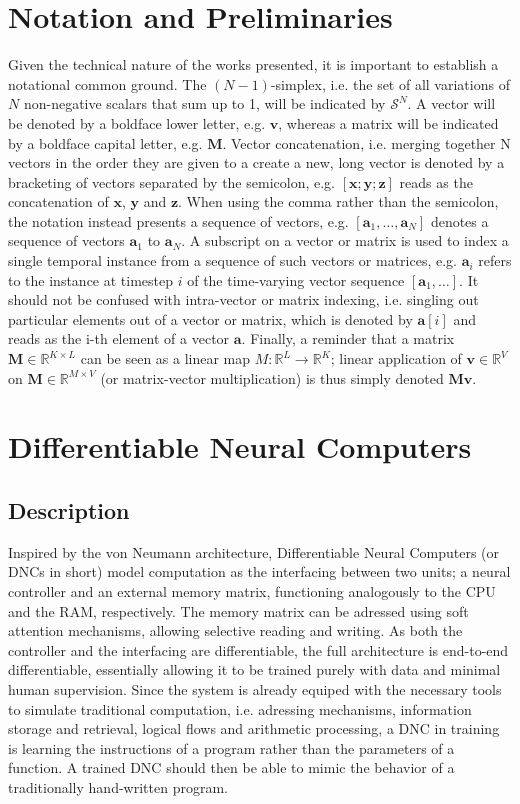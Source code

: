 \documentclass[]{article}
\begin{document}
\section{Notation and Preliminaries}
\label{sec:Notation}
Given the technical nature of the works presented, it is important to establish a notational common ground. The $(N-1)$-simplex, i.e. the set of all variations of $N$ non-negative scalars that sum up to 1, will be indicated by $\mathcal{S}^N$. A vector will be denoted by a boldface lower letter, e.g. $\pmb{v}$, whereas a matrix will be indicated by a boldface capital letter, e.g. $\pmb M$. Vector concatenation, i.e. merging together N vectors in the order they are given to a create a new, long vector is denoted by a bracketing of vectors separated by the semicolon, e.g. $[\pmb{x}; \pmb{y}; \pmb{z}]$ reads as the concatenation of $\pmb x$, $\pmb y$ and $\pmb z$. When using the comma rather than the semicolon, the notation instead presents a sequence of vectors, e.g. $[\pmb a _1, \dots ,\pmb a _N]$ denotes a sequence of vectors $\pmb a _1$ to $\pmb a _N$. A subscript on a vector or matrix is used to index a single temporal instance from a sequence of such vectors or matrices, e.g. $\pmb{a}_i$ refers to the instance at timestep $i$ of the time-varying vector sequence $[\pmb a _1 , \dots ]$. It should not be confused with intra-vector or matrix indexing, i.e. singling out particular elements out of a vector or matrix, which is denoted by $\pmb a [i]$ and reads as the i-th element of a vector $\pmb a$. Finally, a reminder that a matrix $\pmb M \in \mathbb{R}^{K\times L}$ can be seen as a linear map $M: \mathbb{R}^L \to \mathbb{R}^K$; linear application of $\pmb v \in \mathbb{R}^V $ on $\pmb M \in \mathbb{R}^{M \times V}$ (or matrix-vector multiplication) is thus simply denoted $\pmb {Mv}$.


\section{Differentiable Neural Computers}
\label{DNC}
\subsection{Description}
Inspired by the von Neumann architecture, Differentiable Neural Computers (or DNCs in short) model computation as the interfacing between two units; a neural controller and an external memory matrix, functioning analogously to the CPU and the RAM, respectively. The memory matrix can be adressed using soft attention mechanisms, allowing selective reading and writing. As both the controller and the interfacing are differentiable, the full architecture is end-to-end differentiable, essentially allowing it to be trained purely with data and minimal human supervision. Since the system is already equiped with the necessary tools to simulate traditional computation, i.e. adressing mechanisms, information storage and retrieval, logical flows and arithmetic processing, a DNC in training is learning the instructions of a program rather than the parameters of a function. A trained DNC should then be able to mimic the behavior of a traditionally hand-written program.
\end{document}
